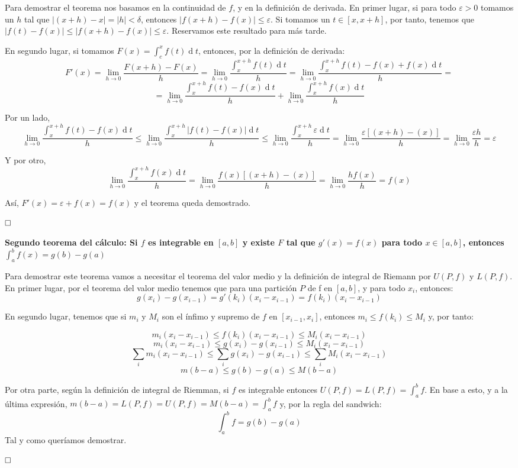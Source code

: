 \documentclass[a4paper]{article}
\renewcommand{\d}[1]{\ensuremath{\operatorname{d}\!{#1}}}
\newcommand{\qed}{\begin{flushright}
		{$\newline\square$}
	\end{flushright}}
\begin{document}
Para demostrar el teorema nos basamos en la continuidad de $f$, y en la definición de derivada. En primer lugar, si para todo $\varepsilon > 0$ tomamos un $h$ tal que $|(x+h)-x| = |h| < \delta$, entonces $|f(x+h)-f(x)| \le \varepsilon$. Si tomamos un $t\in[x,x+h]$, por tanto, tenemos que $|f(t)-f(x)|\le|f(x+h)-f(x)|\le\varepsilon$. Reservamos este resultado para más tarde.

En segundo lugar, si tomamos $F(x) = \int_c^xf(t)\d t$, entonces, por la definición de derivada:
$$F'(x) = \lim_{h\rightarrow0}\frac{F(x+h)-F(x)}{h} =  \lim_{h\rightarrow0}\frac{\int^{x+h}_{x}f(t)\d t}{h}  =  \lim_{h\rightarrow0}\frac{\int^{x+h}_{x}f(t) -f(x)+f(x)\d t}{h} = $$
$$= \lim_{h\rightarrow0}\frac{\int^{x+h}_{x}f(t)-f(x)\d t}{h} +  \lim_{h\rightarrow0}\frac{\int^{x+h}_{x}f(x)\d t}{h}$$

Por un lado,
 $$\lim_{h\rightarrow0}\frac{\int^{x+h}_{x}f(t)-f(x)\d t}{h}\le \lim_{h\rightarrow0}\frac{\int^{x+h}_{x}|f(t)-f(x)|\d t}{h}\le\lim_{h\rightarrow0}\frac{\int^{x+h}_{x}\varepsilon \d t}{h} = \lim_{h\rightarrow0}\frac{\varepsilon[(x+h)-(x)]}{h} =\lim_{h\rightarrow0}\frac{\varepsilon h}{h} = \varepsilon$$

Y por otro,
$$\lim_{h\rightarrow0}\frac{\int^{x+h}_{x}f(x)\d t}{h} = \lim_{h\rightarrow0}\frac{f(x)[(x+h)-(x)]}{h} = \lim_{h\rightarrow0}\frac{h f(x)}{h} = f(x)$$

Así, $F'(x) = \varepsilon + f(x) = f(x)$ y el teorema queda demostrado.\qed

\textbf{Segundo teorema del cálculo: Si $f$ es integrable en $[a,b]$ y existe $F$ tal que $g'(x) = f(x)$ para todo $x\in[a,b]$, entonces $\int_a^bf(x) = g(b)-g(a)$}

Para demostrar este teorema vamos a necesitar el teorema del valor medio y la definición de integral de Riemann por $U(P,f)$ y $L(P,f)$. En primer lugar, por el teorema del valor medio tenemos que para una partición $P$ de f en $[a,b]$, y para todo $x_i$, entonces:
$$g(x_i)-g(x_{i-1}) = g'(k_i)(x_i-x_{i-1}) = f(k_i)(x_i-x_{i-1})$$

En segundo lugar, tenemos que si $m_i$ y $M_i$ son el ínfimo y supremo de $f$ en $[x_{i-1},x_i]$, entonces $m_i \le f(k_i) \le M_i$ y, por tanto:

$$m_i(x_i-x_{i-1}) \le f(k_i)(x_i-x_{i-1}) \le M_i(x_i-x_{i-1})$$
$$m_i(x_i-x_{i-1}) \le g(x_i)-g(x_{i-1}) \le M_i(x_i-x_{i-1})$$
 $$\sum_i m_i(x_i-x_{i-1}) \le \sum_i g(x_i)-g(x_{i-1}) \le \sum_i M_i(x_i-x_{i-1})$$
 $$m(b-a) \le g(b)-g(a) \le M(b-a)$$

Por otra parte, según la definición de integral de Riemman, si $f$ es integrable entonces $U(P,f) = L(P,f) = \int_a^bf$. En base a esto, y a la última expresión, $m(b-a) = L(P,f) = U(P,f) = M(b-a) = \int_a^bf$ y, por la regla del sandwich:
	$$\int_a^bf = g(b)-g(a)$$
	Tal y como queríamos demostrar. \qed
	
\end{document}
